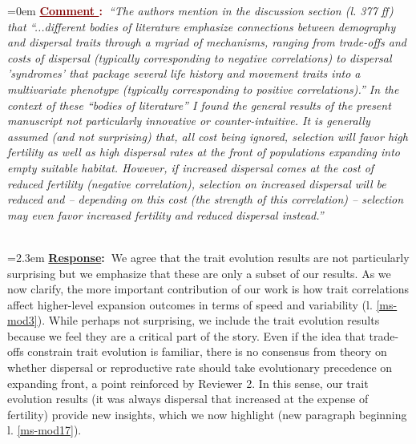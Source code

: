 \documentclass[12pt]{article}
\newcounter{cN}
\newcommand{\comment}[1]{
	\vspace{2em}
	\refstepcounter{cN} %
	\noindent \hangindent=0em \textbf{\textcolor{Maroon}{\uline{Comment \thecN}:~}}\emph{``#1''}
	}
\newcommand{\response}[1]{
	\\[0.25em]
	\hangindent=2.3em \textbf{\textcolor{NavyBlue}{\uline{Response}:~}}#1
	}
\begin{document}
\comment{The authors mention in the discussion section (l. 377 ff) that ``...different bodies of literature emphasize connections between demography and dispersal traits through a myriad of mechanisms, ranging from trade-offs and costs of dispersal (typically corresponding to negative correlations) to dispersal 'syndromes' that package several life history and movement traits into a multivariate phenotype (typically corresponding to positive correlations).''
In the context of these ``bodies of literature'' I found the general results of the present manuscript not particularly innovative or counter-intuitive.
It is generally assumed (and not surprising) that, all cost being ignored, selection will favor high fertility as well as high dispersal rates at the front of populations expanding into empty suitable habitat.
However, if increased dispersal comes at the cost of reduced fertility (negative correlation), selection on increased dispersal will be reduced and – depending on this cost (the strength of this correlation) – selection may even favor increased fertility and reduced dispersal instead.}
\response{We agree that the trait evolution results are not particularly surprising but we emphasize that these are only a subset of our results.
As we now clarify, the more important contribution of our work is how trait correlations affect higher-level expansion outcomes in terms of speed and variability (l. \ref{ms-mod3}).
While perhaps not surprising, we include the trait evolution results because we feel they are a critical part of the story.
Even if the idea that trade-offs constrain trait evolution is familiar, there is no consensus from theory on whether dispersal or reproductive rate should take evolutionary precedence on expanding front, a point reinforced by Reviewer 2.
In this sense, our trait evolution results (it was always dispersal that increased at the expense of fertility) provide new insights, which we now highlight (new paragraph beginning l. \ref{ms-mod17}).}
\end{document}
